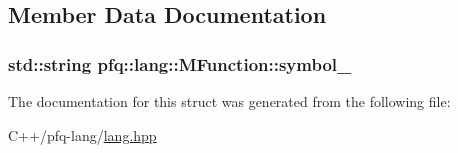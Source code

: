 \subsection{Member Data Documentation}
\hypertarget{structpfq_1_1lang_1_1MFunction_a109c0f1d69464f636c72845072a08a16}{
\subsubsection[{symbol\+\_\+}]{\setlength{\rightskip}{0pt plus 5cm}std\+::string pfq\+::lang\+::\+M\+Function\+::symbol\+\_\+}}\label{structpfq_1_1lang_1_1MFunction_a109c0f1d69464f636c72845072a08a16}


The documentation for this struct was generated from the following file\+:\begin{DoxyCompactItemize}
\item 
C++/pfq-\/lang/\hyperlink{lang_8hpp}{lang.\+hpp}\end{DoxyCompactItemize}
